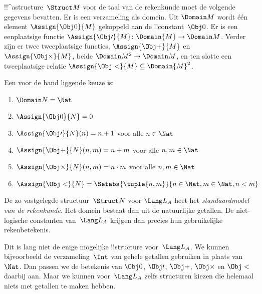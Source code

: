 \documentclass[../../../include/open-logic-section]{subfiles}
\begin{document}
\begin{ex}
!!^a{structure}~$\Struct M$ voor de taal van de rekenkunde moet de
volgende gegevens bevatten. Er is een verzameling als domein. Uit
$\Domain M$ wordt één element $\Assign{\Obj 0}{M}$ gekoppeld aan de
!!{constant}~$\Obj 0$. Er is een eenplaatsige functie
$\Assign{\Obj \prime}{M} \colon \Domain{M} \to \Domain M$. Verder zijn
er twee tweeplaatsige functies, $\Assign{\Obj +}{M}$ en $\Assign{\Obj
\times}{M}$, beide $\Domain M^2 \to \Domain M$, en ten slotte een
tweeplaatsige relatie
$\Assign{\Obj <}{M} \subseteq \Domain{M}^2$.

Een voor de hand liggende keuze is:
\begin{enumerate}
\item $\Domain N = \Nat$
\item $\Assign{\Obj 0}{N} = 0$
\item $\Assign{\Obj \prime}{N}(n) = n + 1$ voor alle $n \in \Nat$
\item $\Assign{\Obj +}{N}(n, m) = n + m$ voor alle $n, m \in \Nat$
\item $\Assign{\Obj \times}{N}(n, m) = n\cdot m$ voor alle $n, m \in \Nat$
\item $\Assign{\Obj <}{N} = \Setabs{\tuple{n, m}}{n \in \Nat, m \in
  \Nat, n < m}$
\end{enumerate}
De zo vastgelegde structuur~$\Struct N$ voor $\Lang L_A$ heet het
\emph{standaardmodel van de rekenkunde}. Het domein bestaat dan uit de
natuurlijke getallen. De niet-logische constanten van~$\Lang L_A$
krijgen dan precies hun gebruikelijke rekenbetekenis.

Dit is lang niet de enige mogelijke !!{structure} voor~$\Lang L_A$.
We kunnen bijvoorbeeld de verzameling~$\Int$ van gehele getallen
gebruiken in plaats van~$\Nat$. Dan passen we de betekenis van $\Obj
0$, $\Obj \prime$, $\Obj +$, $\Obj \times$ en $\Obj <$ daarbij aan.
Maar we kunnen voor~$\Lang L_A$ zelfs structuren kiezen die helemaal niets met
getallen te maken hebben.
\end{ex}
\end{document}
